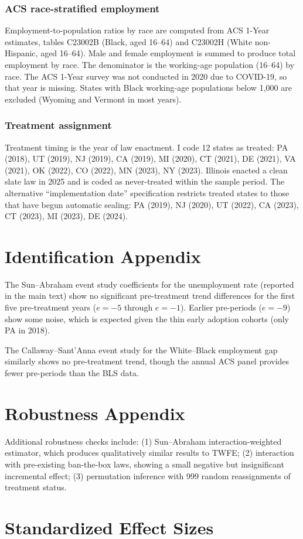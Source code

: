 \documentclass[12pt]{article}
\begin{document}
\subsubsection*{ACS race-stratified employment} Employment-to-population ratios by race are computed from ACS 1-Year estimates, tables C23002B (Black, aged 16--64) and C23002H (White non-Hispanic, aged 16--64). Male and female employment is summed to produce total employment by race. The denominator is the working-age population (16--64) by race. The ACS 1-Year survey was not conducted in 2020 due to COVID-19, so that year is missing. States with Black working-age populations below 1,000 are excluded (Wyoming and Vermont in most years).

\subsubsection*{Treatment assignment} Treatment timing is the year of law enactment. I code 12 states as treated: PA (2018), UT (2019), NJ (2019), CA (2019), MI (2020), CT (2021), DE (2021), VA (2021), OK (2022), CO (2022), MN (2023), NY (2023). Illinois enacted a clean slate law in 2025 and is coded as never-treated within the sample period. The alternative ``implementation date'' specification restricts treated states to those that have begun automatic sealing: PA (2019), NJ (2020), UT (2022), CA (2023), CT (2023), MI (2023), DE (2024).

\section{Identification Appendix}

The Sun--Abraham event study coefficients for the unemployment rate (reported in the main text) show no significant pre-treatment trend differences for the first five pre-treatment years ($e = -5$ through $e = -1$). Earlier pre-periods ($e = -9$) show some noise, which is expected given the thin early adoption cohorts (only PA in 2018).

The Callaway--Sant'Anna event study for the White--Black employment gap similarly shows no pre-treatment trend, though the annual ACS panel provides fewer pre-periods than the BLS data.

\section{Robustness Appendix}

Additional robustness checks include: (1) Sun--Abraham interaction-weighted estimator, which produces qualitatively similar results to TWFE; (2) interaction with pre-existing ban-the-box laws, showing a small negative but insignificant incremental effect; (3) permutation inference with 999 random reassignments of treatment status.

\section{Standardized Effect Sizes}
\label{sec:sde}


\end{document}
